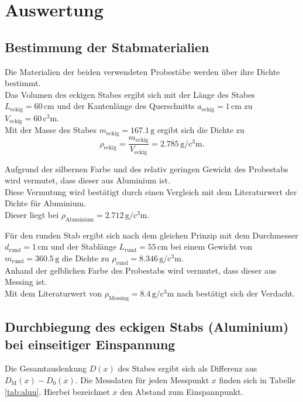 \section{Auswertung}
\label{sec:Auswertung}
\subsection{Bestimmung der Stabmaterialien}
Die Materialien der beiden verwendeten Probestäbe werden über ihre Dichte bestimmt.\\
Das Volumen des eckigen Stabes ergibt sich mit der Länge des Stabes $L_{\mathrm{eckig}}=60\,\si{\centi\meter}$
und der Kantenlänge des Querschnitts $a_{\mathrm{eckig}}=1\,\si{\centi\meter}$ zu $V_{\mathrm{eckig}}=60\,\si{\cubic\centi\meter}$.\\
Mit der Masse des Stabes $m_{\mathrm{eckig}}=167.1\,\si{\gram}$ ergibt sich die Dichte zu
\begin{equation}
	\rho_{\mathrm{eckig}}=\frac{m_{\mathrm{eckig}}}{V_{\mathrm{eckig}}}=2.785 \,\si{\gram\per\cubic\centi\meter}\text{.}
\end{equation}

Aufgrund der silbernen Farbe und des relativ geringen Gewicht des Probestabs wird vermutet, dass dieser aus Aluminium ist.\\
Diese Vermutung wird bestätigt durch einen Vergleich mit dem Literaturwert der Dichte für Aluminium.\\
Dieser liegt bei $\rho_{\mathrm{Aluminium}}=2.712\,\si{\gram\per\cubic\centi\meter}$. \cite{Werkzeugkiste}

Für den runden Stab ergibt sich nach dem gleichen Prinzip mit dem Durchmesser $d_{\mathrm{rund}}=1\,\si{\centi\meter}$ und der Stablänge $L_{\mathrm{rund}}=55\,\si{\centi\meter}$ bei einem
Gewicht von $m_{\mathrm{rund}}=360.5\,\si{\gram}$ die Dichte zu $\rho_{\mathrm{rund}}=8.346 \,\si{\gram\per\cubic\centi\meter}$.\\
Anhand der gelblichen Farbe des Probestabs wird vermutet, dass dieser aus Messing ist.\\
Mit dem Literaturwert von $\rho_{\mathrm{Messing}}=8.4\,\si{\gram\per\cubic\centi\meter}$ nach \cite{Werkzeugkiste} %
bestätigt sich der Verdacht.

\FloatBarrier
\subsection{Durchbiegung des eckigen Stabs (Aluminium) bei einseitiger Einspannung}
Die Gesamtauslenkung $D(x)$ des Stabes ergibt sich als Differenz aus $D_{\mathrm{M}}(x)-D_{\mathrm{0}}(x)$.
Die Messdaten für jeden Messpunkt $x$ finden sich in Tabelle \ref{tab:aluu}. Hierbei bezeichnet $x$ den Abstand zum Einspannpunkt.

